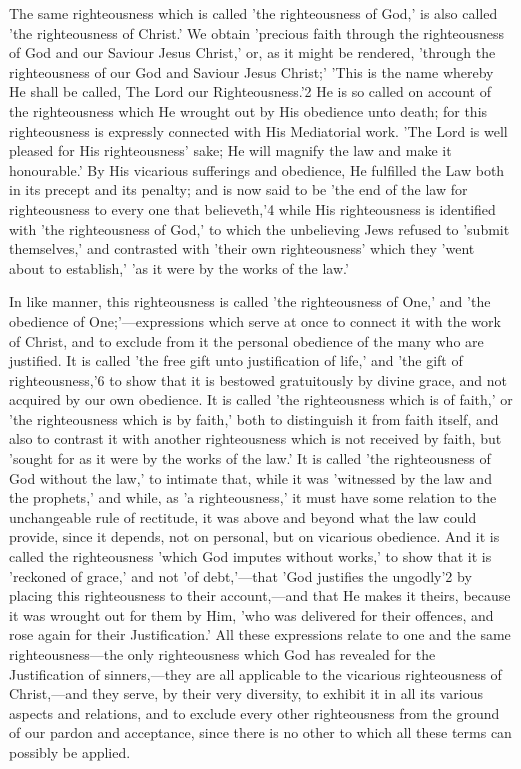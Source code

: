 \documentclass[
]{book}
\begin{document}
The same righteousness which is called 'the righteousness of God,' is also called 'the righteousness of Christ.' We obtain 'precious faith through the righteousness of God and our Saviour Jesus Christ,' or, as it might be rendered, 'through the righteousness of our God and Saviour Jesus Christ;' 'This is the name whereby He shall be called, The Lord our Righteousness.'2 He is so called on account of the righteousness which He wrought out by His obedience unto death; for this righteousness is expressly connected with His Mediatorial work. 'The Lord is well pleased for His righteousness' sake; He will magnify the law and make it honourable.' By His vicarious sufferings and obedience, He fulfilled the Law both in its precept and its penalty; and is now said to be 'the end of the law for righteousness to every one that believeth,'4 while His righteousness is identified with 'the righteousness of God,' to which the unbelieving Jews refused to 'submit themselves,' and contrasted with 'their own righteousness' which they 'went about to establish,' 'as it were by the works of the law.'

In like manner, this righteousness is called 'the righteousness of One,' and 'the obedience of One;'---expressions which serve at once to connect it with the work of Christ, and to exclude from it the personal obedience of the many who are justified. It is called 'the free gift unto justification of life,' and 'the gift of righteousness,'6 to show that it is bestowed gratuitously by divine grace, and not acquired by our own obedience. It is called 'the righteousness which is of faith,' or 'the righteousness which is by faith,' both to distinguish it from faith itself, and also to contrast it with another righteousness which is not received by faith, but 'sought for as it were by the works of the law.' It is called 'the righteousness of God without the law,' to intimate that, while it was 'witnessed by the law and the prophets,' and while, as 'a righteousness,' it must have some relation to the unchangeable rule of rectitude, it was above and beyond what the law could provide, since it depends, not on personal, but on vicarious obedience. And it is called the righteousness 'which God imputes without works,' to show that it is 'reckoned of grace,' and not 'of debt,'---that 'God justifies the ungodly'2 by placing this righteousness to their account,---and that He makes it theirs, because it was wrought out for them by Him, 'who was delivered for their offences, and rose again for their Justification.' All these expressions relate to one and the same righteousness---the only righteousness which God has revealed for the Justification of sinners,---they are all applicable to the vicarious righteousness of Christ,---and they serve, by their very diversity, to exhibit it in all its various aspects and relations, and to exclude every other righteousness from the ground of our pardon and acceptance, since there is no other to which all these terms can possibly be applied.
\end{document}
